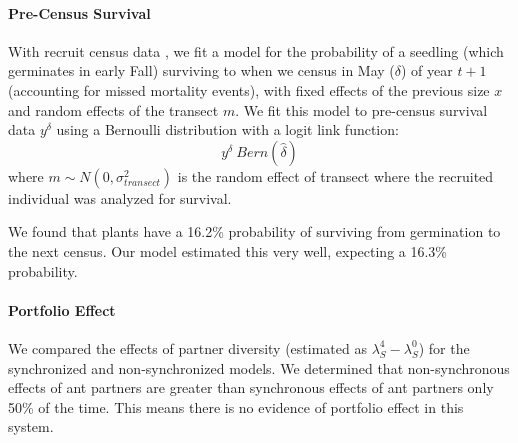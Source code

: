 \documentclass[11pt]{article}
\begin{document}
\paragraph{Pre-Census Survival}
With recruit census data \cite{Miller2006}, we fit a model for the probability of a seedling (which germinates in early Fall) surviving to when we census in May ($\delta$) of year $t+1$ (accounting for missed mortality events), with fixed effects of the previous size $x$ and random effects of the transect $m$.
We fit this model to pre-census survival data $y^{\delta}$ using a Bernoulli distribution with a logit link function: 
$$y^{\delta} ~ Bern(\hat{\delta})$$
where $m \sim N(0, \sigma_{transect}^2)$ is the random effect of transect where the recruited individual was analyzed for survival.

We found that plants have a 16.2\% probability of surviving from germination to the next census.
Our model estimated this very well, expecting a 16.3\% probability.


\paragraph{Portfolio Effect}
We compared the effects of partner diversity (estimated as $\lambda_S^4 - \lambda_S^0$) for the synchronized and non-synchronized models.
We determined that non-synchronous effects of ant partners are greater than synchronous effects of ant partners only 50\% of the time.
This means there is no evidence of portfolio effect in this system.

\renewcommand{\thefigure}{A\arabic{figure}}
\end{document}
